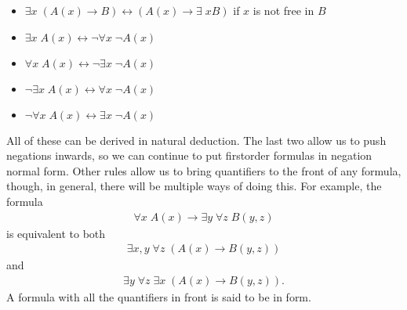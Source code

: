 \documentclass[letterpaper,10pt,english]{sphinxmanual}
\begin{document}
\begin{itemize}
\item {} 
\sphinxAtStartPar
\(\exists x \; (A(x) \to B) \leftrightarrow (A(x) \to \exists \; x B)\) if \(x\) is not free in \(B\)

\item {} 
\sphinxAtStartPar
\(\exists x \; A(x) \leftrightarrow \neg \forall x \; \neg A(x)\)

\item {} 
\sphinxAtStartPar
\(\forall x \; A(x) \leftrightarrow \neg \exists x \; \neg A(x)\)

\item {} 
\sphinxAtStartPar
\(\neg \exists x \; A(x) \leftrightarrow \forall x \; \neg A(x)\)

\item {} 
\sphinxAtStartPar
\(\neg \forall x \; A(x) \leftrightarrow \exists x \; \neg A(x)\)

\end{itemize}

\sphinxAtStartPar
All of these can be derived in natural deduction. The last two allow us to push negations inwards, so we can continue to put first\sphinxhyphen{}order formulas in negation normal form. Other rules allow us to bring quantifiers to the front of any formula, though, in general, there will be multiple ways of doing this. For example, the formula
\begin{equation*}
\begin{split}\forall x \; A(x) \to \exists y \; \forall z \; B(y, z)\end{split}
\end{equation*}
\sphinxAtStartPar
is equivalent to both
\begin{equation*}
\begin{split}\exists x, y \; \forall z \; (A(x) \to B(y, z))\end{split}
\end{equation*}
\sphinxAtStartPar
and
\begin{equation*}
\begin{split}\exists y \; \forall z \; \exists x \; (A(x) \to B(y, z)).\end{split}
\end{equation*}
\sphinxAtStartPar
A formula with all the quantifiers in front is said to be in  form.
\end{document}

